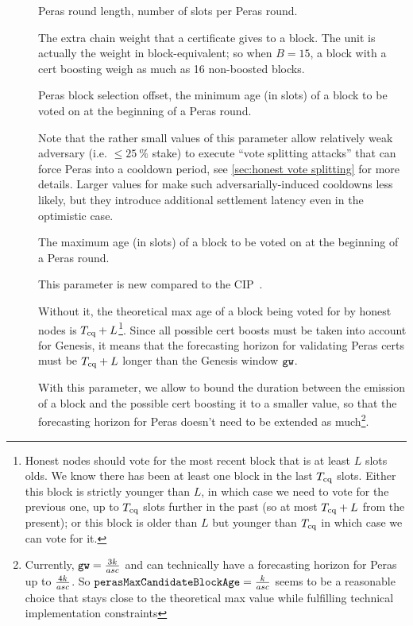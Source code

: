 \begin{description}
\item[\perasRoundSlots]
  Peras round length, number of slots per Peras round.
\item[\perasBoost]
  The extra chain weight that a certificate gives to a block. The unit is actually the weight in block-equivalent; so when $B = 15$, a block with a cert boosting weigh as much as 16 non-boosted blocks.
\item[\perasBlockMinSlots]
  Peras block selection offset, the minimum age (in slots) of a block to be voted on at the beginning of a Peras round.

  Note that the rather small values of this parameter allow relatively weak adversary (i.e. $\le \qty{25}{\percent}$ stake) to execute \enquote{vote splitting attacks} that can force Peras into a cooldown period, see \cref{sec:honest vote splitting} for more details.
  Larger values for \perasBlockMinSlots{} make such adversarially-induced cooldowns less likely, but they introduce additional settlement latency even in the optimistic case.
\item[\perasBlockMaxSlots]
  The maximum age (in slots) of a block to be voted on at the beginning of a Peras round.

  This parameter is new compared to the CIP~\cite{peras-cip}.

  Without it, the theoretical max age of a block being voted for by honest nodes is $T_{\text{cq}} + L$\footnote{Honest nodes should vote for the most recent block that is at least $L$ slots olds. We know there has been at least one block in the last $T_{\text{cq}}$ slots. Either this block is strictly younger than $L$, in which case we need to vote for the previous one, up to $T_{\text{cq}}$ slots further in the past (so at most $T_{\text{cq}} + L$ from the present); or this block is older than $L$ but younger than $T_{\text{cq}}$ in which case we can vote for it.}. Since all possible cert boosts must be taken into account for Genesis, it means that the forecasting horizon for validating Peras certs must be $T_{\text{cq}} + L$ longer than the Genesis window $\mathtt{gw}$.

  With this parameter, we allow to bound the duration between the emission of a block and the possible cert boosting it to a smaller value, so that the forecasting horizon for Peras doesn't need to be extended as much\footnote{Currently, $\mathtt{gw} = \frac{3k}{asc}$ and can technically have a forecasting horizon for Peras up to $\frac{4k}{asc}$. So $\mathtt{perasMaxCandidateBlockAge} = \frac{k}{asc}$ seems to be a reasonable choice that stays close to the theoretical max value while fulfilling technical implementation constraints}.


\end{description}
